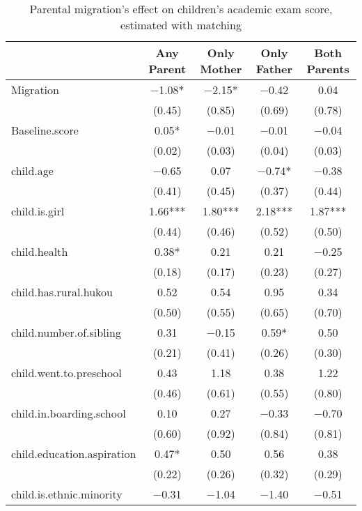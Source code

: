 \documentclass[
  man]{apa7}
\begin{document}
\begin{table}

\caption{Parental migration’s effect on children’s academic exam score, estimated with matching}
\centering
\begin{tabular}[t]{lcccc}
\toprule
  & Any Parent & Only Mother & Only Father & Both Parents\\
\midrule
Migration & \num{-1.08}* & \num{-2.15}* & \num{-0.42} & \num{0.04}\\
 & (\num{0.45}) & (\num{0.85}) & (\num{0.69}) & (\num{0.78})\\
Baseline.score & \num{0.05}* & \num{-0.01} & \num{-0.01} & \num{-0.04}\\
 & (\num{0.02}) & (\num{0.03}) & (\num{0.04}) & (\num{0.03})\\
child.age & \num{-0.65} & \num{0.07} & \num{-0.74}* & \num{-0.38}\\
 & (\num{0.41}) & (\num{0.45}) & (\num{0.37}) & (\num{0.44})\\
child.is.girl & \num{1.66}*** & \num{1.80}*** & \num{2.18}*** & \num{1.87}***\\
 & (\num{0.44}) & (\num{0.46}) & (\num{0.52}) & (\num{0.50})\\
child.health & \num{0.38}* & \num{0.21} & \num{0.21} & \num{-0.25}\\
 & (\num{0.18}) & (\num{0.17}) & (\num{0.23}) & (\num{0.27})\\
child.has.rural.hukou & \num{0.52} & \num{0.54} & \num{0.95} & \num{0.34}\\
 & (\num{0.50}) & (\num{0.55}) & (\num{0.65}) & (\num{0.70})\\
child.number.of.sibling & \num{0.31} & \num{-0.15} & \num{0.59}* & \num{0.50}\\
 & (\num{0.21}) & (\num{0.41}) & (\num{0.26}) & (\num{0.30})\\
child.went.to.preschool & \num{0.43} & \num{1.18} & \num{0.38} & \num{1.22}\\
 & (\num{0.46}) & (\num{0.61}) & (\num{0.55}) & (\num{0.80})\\
child.in.boarding.school & \num{0.10} & \num{0.27} & \num{-0.33} & \num{-0.70}\\
 & (\num{0.60}) & (\num{0.92}) & (\num{0.84}) & (\num{0.81})\\
child.education.aspiration & \num{0.47}* & \num{0.50} & \num{0.56} & \num{0.38}\\
 & (\num{0.22}) & (\num{0.26}) & (\num{0.32}) & (\num{0.29})\\
child.is.ethnic.minority & \num{-0.31} & \num{-1.04} & \num{-1.40} & \num{-0.51}\\

\end{tabular}
\end{table}
\end{document}
